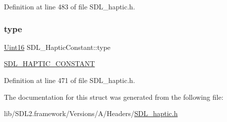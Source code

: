 Definition at line 483 of file S\+D\+L\+\_\+haptic.\+h.

\mbox{\label{struct_s_d_l___haptic_constant_a5cb31202803a8bc1be95fcede5ac8afb}} 
\subsubsection{\texorpdfstring{type}{type}}
{\footnotesize\ttfamily \mbox{\hyperlink{_s_d_l__stdinc_8h_a31fcc0a076c9068668173ee26d33e42b}{Uint16}} S\+D\+L\+\_\+\+Haptic\+Constant\+::type}

\mbox{\hyperlink{_s_d_l__haptic_8h_a955fb9f680dcf9cc72a3d5263e85b80a}{S\+D\+L\+\_\+\+H\+A\+P\+T\+I\+C\+\_\+\+C\+O\+N\+S\+T\+A\+NT}} 

Definition at line 471 of file S\+D\+L\+\_\+haptic.\+h.



The documentation for this struct was generated from the following file\+:\begin{DoxyCompactItemize}
\item 
lib/\+S\+D\+L2.\+framework/\+Versions/\+A/\+Headers/\mbox{\hyperlink{_s_d_l__haptic_8h}{S\+D\+L\+\_\+haptic.\+h}}\end{DoxyCompactItemize}
